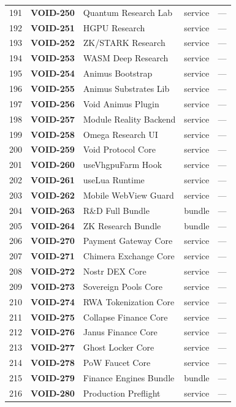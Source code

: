 \documentclass[10pt,a4paper,landscape]{article}
\begin{document}
\begin{longtable}{@{}rl p{4.2cm} p{1.4cm} p{3.8cm}@{}}
191 & \textbf{VOID-250} & Quantum Research Lab & service & — \\
192 & \textbf{VOID-251} & HGPU Research & service & — \\
193 & \textbf{VOID-252} & ZK/STARK Research & service & — \\
194 & \textbf{VOID-253} & WASM Deep Research & service & — \\
195 & \textbf{VOID-254} & Animus Bootstrap & service & — \\
196 & \textbf{VOID-255} & Animus Substrates Lib & service & — \\
197 & \textbf{VOID-256} & Void Animus Plugin & service & — \\
198 & \textbf{VOID-257} & Module Reality Backend & service & — \\
199 & \textbf{VOID-258} & Omega Research UI & service & — \\
200 & \textbf{VOID-259} & Void Protocol Core & service & — \\
201 & \textbf{VOID-260} & useVhgpuFarm Hook & service & — \\
202 & \textbf{VOID-261} & useLua Runtime & service & — \\
203 & \textbf{VOID-262} & Mobile WebView Guard & service & — \\
204 & \textbf{VOID-263} & R\&D Full Bundle & bundle & — \\
205 & \textbf{VOID-264} & ZK Research Bundle & bundle & — \\
206 & \textbf{VOID-270} & Payment Gateway Core & service & — \\
207 & \textbf{VOID-271} & Chimera Exchange Core & service & — \\
208 & \textbf{VOID-272} & Nostr DEX Core & service & — \\
209 & \textbf{VOID-273} & Sovereign Pools Core & service & — \\
210 & \textbf{VOID-274} & RWA Tokenization Core & service & — \\
211 & \textbf{VOID-275} & Collapse Finance Core & service & — \\
212 & \textbf{VOID-276} & Janus Finance Core & service & — \\
213 & \textbf{VOID-277} & Ghost Locker Core & service & — \\
214 & \textbf{VOID-278} & PoW Faucet Core & service & — \\
215 & \textbf{VOID-279} & Finance Engines Bundle & bundle & — \\
216 & \textbf{VOID-280} & Production Preflight & service & — \\

\end{longtable}
\end{document}
